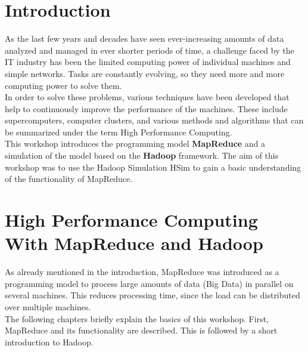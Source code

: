 \lstset{language=Java, numbers=left, numberstyle=\tiny, stepnumber=2, numbersep=5pt}
\chapter{Introduction}
\label{intro}
As the last few years and decades have seen ever-increasing amounts of data analyzed and managed in ever shorter periods of time, a challenge faced by the IT industry has been the limited computing power of individual machines and simple networks. Tasks are constantly evolving, so they need more and more computing power to solve them.\\
In order to solve these problems, various techniques have been developed that help to continuously improve the performance of the machines. These include supercomputers, computer clusters, and various methods and algorithms that can be summarized under the term High Performance Computing.\\
This workshop introduces the programming model \textbf{MapReduce} and a simulation of the model based on the \textbf{Hadoop} framework. The aim of this workshop was to use the Hadoop Simulation HSim to gain a basic understanding of the functionality of MapReduce.
\chapter{High Performance Computing With MapReduce and Hadoop}
\label{high}
As already mentioned in the introduction, MapReduce was introduced as a programming model to process large amounts of data (Big Data) in parallel on several machines. This reduces processing time, since the load can be distributed over multiple machines.\\
The following chapters briefly explain the basics of this workshop. First, MapReduce and its functionality are described. This is followed by a short introduction to Hadoop.
